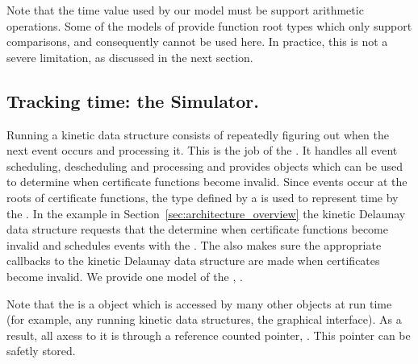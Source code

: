 
Note that the time value used by our  model
must be support arithmetic operations. Some of the models of
 provide function root types which only support
comparisons, and consequently cannot be used here. In practice, this
is not a severe limitation, as discussed in the next section.

\subsection{Tracking time: the Simulator.}
\label{sec:simulator}

Running a kinetic data structure consists of repeatedly figuring out
when the next event occurs and processing it. This is the job of the
. It handles all event scheduling, descheduling and
processing and provides objects which can be used to determine when
certificate functions become invalid. Since events occur at the roots
of certificate functions, the  type defined by a
 is used to represent time by the . In the
example in Section~\ref{sec:architecture_overview} the kinetic
Delaunay data structure requests that the  determine
when  certificate functions become invalid and
schedules events with the . The  also
makes sure the appropriate callbacks to the kinetic Delaunay data
structure are made when certificates become invalid. We provide one
model of the , .

Note that the  is a object which is accessed by many
other objects at run time (for example, any running kinetic data
structures, the graphical interface). As a result, all axess to it is
through a reference counted pointer, . This
pointer can be safetly stored.


